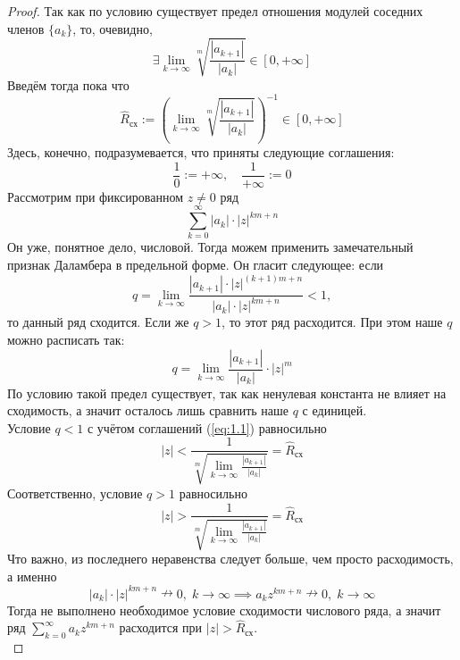 \documentclass[11pt]{article}
\begin{document}
\begin{proof}
    Так как по условию существует предел отношения модулей соседних членов $\{a_k\}$, то, очевидно,
    \[\exists \lim_{k \to \infty} \sqrt[m]{\frac{\left\lvert a_{k + 1}\right\rvert }{\left\lvert a_k \right\rvert }} \in [0, +\infty]\]
    Введём тогда пока что 
    \[\widehat{R}_{\text{сх}} := \left(\lim_{k \to \infty} \sqrt[m]{\frac{\left\lvert a_{k + 1}\right\rvert }{\left\lvert a_k \right\rvert}} \right)^{-1} \in [0, +\infty]\]
    Здесь, конечно, подразумевается, что приняты следующие соглашения:
    \begin{equation} \label{eq:1.1}
        \frac{1}{0} := +\infty, \quad \frac{1}{+\infty} := 0
    \end{equation}
    Рассмотрим при фиксированном $z \neq 0$ ряд
    \[\sum_{k = 0}^{\infty} \left\lvert a_k \right\rvert \cdot \left\lvert z \right\rvert^{km + n}\]
    Он уже, понятное дело, числовой. Тогда можем применить замечательный признак Даламбера в предельной форме. Он гласит следующее: если 
    \[q = \lim_{k \to \infty} \frac{\left\lvert a_{k + 1} \right\rvert \cdot \left\lvert z \right\rvert^{(k + 1)m + n}}{\left\lvert a_k \right\rvert \cdot \left\lvert z \right\rvert^{km + n}} < 1,\]
    то данный ряд сходится. Если же $q > 1$, то этот ряд расходится. При этом наше $q$ можно расписать так:
    \[q = \lim_{k \to \infty} \frac{\left\lvert a_{k + 1} \right\rvert}{\left\lvert a_k \right\rvert} \cdot \left\lvert z \right\rvert^m\]
    По условию такой предел существует, так как ненулевая константа не влияет на сходимость, а значит осталось лишь сравнить наше $q$ с единицей. \\
    Условие $q < 1$ с учётом соглашений (\ref{eq:1.1}) равносильно
    \[\left\lvert z \right\rvert < \frac{1}{\sqrt[m]{\displaystyle \lim_{k \to \infty} \frac{\left\lvert a_{k + 1} \right\rvert}{\left\lvert a_k \right\rvert}}} = \widehat{R}_{\text{сх}}\]
    Соответственно, условие $q > 1$ равносильно 
    \[\left\lvert z \right\rvert > \frac{1}{\sqrt[m]{\displaystyle \lim_{k \to \infty} \frac{\left\lvert a_{k + 1} \right\rvert}{\left\lvert a_k \right\rvert}}} = \widehat{R}_{\text{сх}}\]
    Что важно, из последнего неравенства следует больше, чем просто расходимость, а именно 
    \[\left\lvert a_k \right\rvert \cdot \left\lvert z \right\rvert^{km + n} \nrightarrow 0, \; k \to \infty \implies a_k z^{km + n} \nrightarrow 0, \; k \to \infty\]
    Тогда не выполнено необходимое условие сходимости числового ряда, а значит ряд $\displaystyle \sum_{k = 0}^{\infty} a_k z^{km + n}$ расходится при $\left\lvert z \right\rvert > \widehat{R}_{\text{сх}}$. \\

\end{proof}
\end{document}
